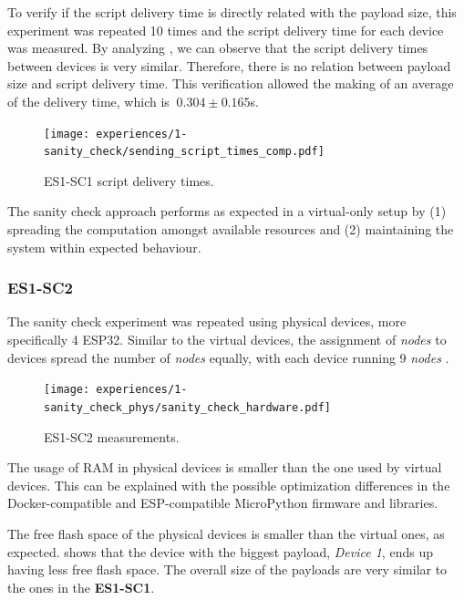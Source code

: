 To verify if the script delivery time is directly related with the payload size, this experiment was repeated 10 times and the script delivery time for each device was measured. By analyzing , we can observe that the script delivery times between devices is very similar. Therefore, there is no relation between payload size and script delivery time. This verification allowed the making of an average of the delivery time, which is $~0.304\pm0.165$s. 

\begin{figure}[h]
\centering
\texttt{[image: experiences/1-sanity\_check/sending\_script\_times\_comp.pdf]}
\caption[ES1-SC1 delivery times.]{ES1-SC1 script delivery times.}\label{fig:delivery_times_comp}
\end{figure}

The sanity check approach performs as expected in a virtual-only setup by (1) spreading the computation amongst available resources and (2) maintaining the system within expected behaviour.



\subsubsection{ES1-SC2}\label{sec:sanity_check_phys_exp}

The sanity check experiment was repeated using physical devices, more specifically 4 ESP32. Similar to the virtual devices, the assignment of \textit{nodes} to devices spread the number of \textit{nodes} equally, with each device running 9 \textit{nodes} .

\begin{figure}[h]
\centering
\texttt{[image: experiences/1-sanity\_check\_phys/sanity\_check\_hardware.pdf]}
\caption[ES1-SC2 measurements.]{ES1-SC2 measurements.}\label{fig:sanity_check_phys_graph}
\end{figure}

The usage of RAM in physical devices is smaller than the one used by virtual devices. This can be explained with the possible optimization differences in the Docker-compatible and ESP-compatible MicroPython firmware and libraries.

The free flash space of the physical devices is smaller than the virtual ones, as expected.  shows that the device with the biggest payload, \textit{Device 1}, ends up having less free flash space. The overall size of the payloads are very similar to the ones in the \textbf{ES1-SC1}. 

